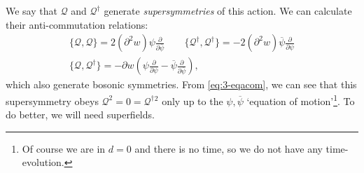 We say that $\mathcal{Q}$ and $\mathcal{Q}^{\dagger}$ generate \emph{supersymmetries} of this action.
We can calculate their anti-commutation relations:
\begin{subequations}
  \begin{gather}
    \{\mathcal{Q} , \mathcal{Q}\} = 2 (\partial^2 w) \psi \frac{\partial }{\partial \overline{\psi}} \qquad 
    \{\mathcal{Q}^{\dagger}, \mathcal{Q}^{\dagger}\} = - 2 (\partial^2 w) \overline{\psi} \frac{\partial }{\partial \psi} \label{eq:3-eqacom} \\
  \{\mathcal{Q}, \mathcal{Q}^{\dagger}\} = - \partial w \left( \psi \frac{\partial }{\partial \psi} - \overline{\psi} \frac{\partial }{\partial \overline{\psi}} \right),
  \end{gather}
\end{subequations}
which also generate bosonic symmetries.
From \eqref{eq:3-eqacom}, we can see that this supersymmetry obeys $\mathcal{Q}^2 = 0 = \mathcal{Q}^{\dagger}{}^2$ only up to the $\psi, \overline{\psi}$ `equation of motion'\footnote{Of course we are in $d=0$ and there is no time, so we do not have any time-evolution.}. To do better, we will need superfields.

